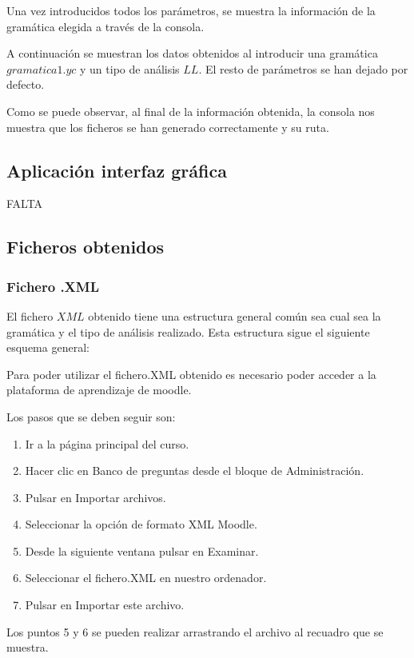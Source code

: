 Una vez introducidos todos los parámetros, se muestra la información de la gramática elegida a través de la consola.

A continuación se muestran los datos obtenidos al introducir una gramática $gramatica1.yc$ y un tipo de análisis $LL$. El resto de parámetros se han dejado por defecto.


Como se puede observar, al final de la información obtenida, la consola nos muestra que los ficheros se han generado correctamente y su ruta.


\subsection{Aplicación interfaz gráfica}
FALTA


\subsection{Ficheros obtenidos}
\subsubsection{Fichero .XML}

El fichero $XML$ obtenido tiene una estructura general común sea cual sea la gramática y el tipo de análisis realizado. Esta estructura sigue el siguiente esquema general:

Para poder utilizar el fichero.XML obtenido es necesario poder acceder a la plataforma de aprendizaje de moodle.

Los pasos que se deben seguir son:
\begin{enumerate}
\item Ir a la página principal del curso.
\item Hacer clic en Banco de preguntas desde el bloque de Administración.
\item Pulsar en Importar archivos.
\item Seleccionar la opción de formato XML Moodle.
\item Desde la siguiente ventana pulsar en Examinar.
\item Seleccionar el fichero.XML en nuestro ordenador.
\item Pulsar en Importar este archivo.
\end{enumerate}

Los puntos 5 y 6 se pueden realizar arrastrando el archivo al recuadro que se muestra.


